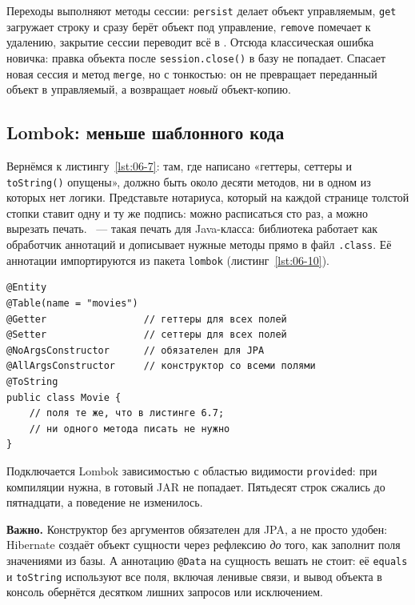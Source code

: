 Переходы выполняют методы сессии: \texttt{persist} делает объект управляемым,
\texttt{get} загружает строку и сразу берёт объект под управление,
\texttt{remove} помечает к удалению, закрытие сессии переводит всё в
. Отсюда классическая ошибка новичка: правка объекта после
\texttt{session.close()} в базу не попадает. Спасает новая сессия и метод
\texttt{merge}, но с тонкостью: он не превращает переданный объект в
управляемый, а возвращает \emph{новый} объект-копию.

\subsection{Lombok: меньше шаблонного кода}

Вернёмся к листингу~\ref{lst:06-7}: там, где написано «геттеры, сеттеры и
\texttt{toString()} опущены», должно быть около десяти методов, ни в одном из
которых нет логики. Представьте нотариуса, который на каждой странице толстой
стопки ставит одну и ту же подпись: можно расписаться сто раз, а можно
вырезать печать. ~--- такая печать для Java-класса: библиотека
работает как обработчик аннотаций и дописывает нужные методы прямо в файл
\texttt{.class}. Её аннотации импортируются из пакета \texttt{lombok}
(листинг~\ref{lst:06-10}).

\begin{listing}[H]
\begin{verbatim}
@Entity
@Table(name = "movies")
@Getter                 // геттеры для всех полей
@Setter                 // сеттеры для всех полей
@NoArgsConstructor      // обязателен для JPA
@AllArgsConstructor     // конструктор со всеми полями
@ToString
public class Movie {
    // поля те же, что в листинге 6.7;
    // ни одного метода писать не нужно
}
\end{verbatim}
\caption{Класс-сущность с аннотациями Lombok}
\label{lst:06-10}
\end{listing}

Подключается Lombok зависимостью с областью видимости \texttt{provided}: при
компиляции нужна, в готовый JAR не попадает. Пятьдесят строк сжались до
пятнадцати, а поведение не изменилось.

\begin{vrezka}
\textbf{Важно.} Конструктор без аргументов обязателен для JPA, а не просто
удобен: Hibernate создаёт объект сущности через рефлексию \emph{до} того, как
заполнит поля значениями из базы. А аннотацию \texttt{@Data} на сущность
вешать не стоит: её \texttt{equals} и \texttt{toString} используют все поля,
включая ленивые связи, и вывод объекта в консоль обернётся десятком лишних
запросов или исключением.
\end{vrezka}

